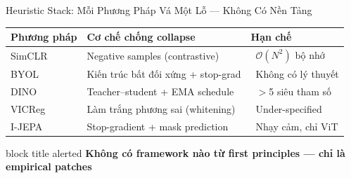 \documentclass[aspectratio=169,11pt]{beamer}
\newcommand{\xmark}{\ding{55}}
\newcommand{\takeaway}[1]{%
  \vfill
  \begin{beamercolorbox}[sep=4pt,center,rounded=true]{block title alerted}
    \small\bfseries #1
  \end{beamercolorbox}%
}
\begin{document}
\begin{frame}{Heuristic Stack: Mỗi Phương Pháp Vá Một Lỗ — Không Có Nền Tảng}
\centering\footnotesize
\begin{tabular}{l >{\raggedright\arraybackslash}p{3.3cm} >{\raggedright\arraybackslash}p{3.9cm}}
\toprule
\textbf{Phương pháp} & \textbf{Cơ chế chống collapse} & \textbf{Hạn chế} \\
\midrule
SimCLR  & Negative samples (contrastive)
        & \cellcolor{bad!20}\textcolor{bad}{\xmark}\ $\mathcal{O}(N^2)$ bộ nhớ \\
BYOL    & Kiến trúc bất đối xứng + stop-grad
        & \cellcolor{bad!20}\textcolor{bad}{\xmark}\ Không có lý thuyết \\
DINO    & Teacher--student + EMA schedule
        & \cellcolor{bad!20}\textcolor{bad}{\xmark}\ $>$5 siêu tham số \\
VICReg  & Làm trắng phương sai (whitening)
        & \cellcolor{bad!20}\textcolor{bad}{\xmark}\ Under-specified \\
I-JEPA  & Stop-gradient + mask prediction
        & \cellcolor{bad!20}\textcolor{bad}{\xmark}\ Nhạy cảm, chỉ ViT \\
\bottomrule
\end{tabular}
\takeaway{Không có framework nào từ first principles — chỉ là empirical patches}
\end{frame}
\end{document}
